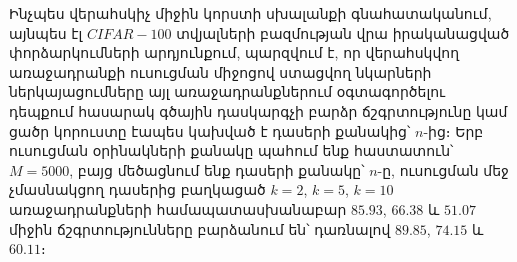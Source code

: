 \documentclass[12pt]{article}
\begin{document}
\par Ինչպես վերահսկիչ միջին կորստի սխալանքի գնահատականում, այնպես էլ $CIFAR-100$ տվյալների բազմության վրա իրականացված փորձարկումների արդյունքում, պարզվում է, որ վերահսկվող առաջադրանքի ուսուցման միջոցով ստացվող նկարների ներկայացումները այլ առաջադրանքներում օգտագործելու դեպքում հասարակ գծային դասկարգչի բարձր ճշգրտությունը կամ ցածր կորուստը էապես կախված է դասերի քանակից՝ $n$-ից։  Երբ ուսուցման օրինակների քանակը պահում ենք հաստատուն՝ $M=5000$, բայց մեծացնում ենք դասերի քանակը՝ $n$-ը, ուսուցման մեջ չմասնակցող դասերից բաղկացած $k=2$, $k=5$, $k=10$ առաջադրանքների համապատասխանաբար $85.93$, $66.38$ և $51.07$ միջին ճշգրտությունները բարձանում են՝ դառնալով $89.85$, $74.15$ և $60.11$։ 
%

\vspace{10mm}
\end{document}
